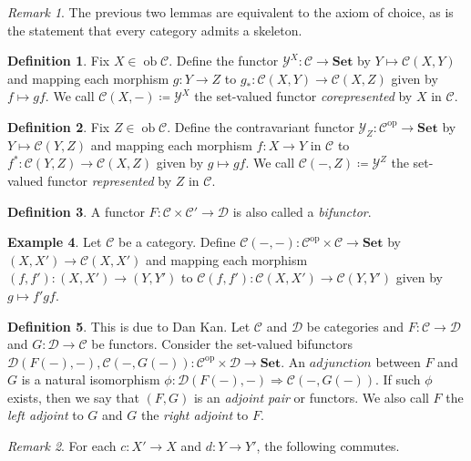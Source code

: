 \documentclass[10pt,letterpaper,cm]{nupset}
\theoremstyle{definition}
\newtheorem{definition}{Definition}
\newtheorem{exmp}[definition]{Example}
\theoremstyle{theorem}
\theoremstyle{remark}
\newtheorem{remark}{Remark}
\newcommand{\1}{\mathbf{1}}
\renewcommand{\c}{\mathscr{C}}
\renewcommand{\d}{\mathscr{D}}
\newcommand{\y}{\mathscr{Y}}
\newcommand{\0}{\vec 0}
\DeclareMathOperator{\op}{op}
\DeclareMathOperator{\ob}{ob}
\begin{document}
\begin{remark}
The previous two lemmas are equivalent to the axiom of choice, as is the statement that every category admits a skeleton.
\end{remark}

\begin{definition}
Fix $X \in \ob \c$. Define the functor $\y^X : \c \to \mathbf{Set}$ by $Y \mapsto \c(X, Y)$  and mapping each morphism $g: Y \to Z$ to $g_{\ast} : \c(X, Y) \to \c(X, Z)$ given by $f \mapsto gf$. We call $\c(X, -)\coloneqq\y^X$ the set-valued functor \textit{corepresented} by $X$ in $\c$.
\end{definition}

\begin{definition}
Fix $Z \in \ob \c$. Define the contravariant functor $\y_Z: \c^{\op} \to \mathbf{Set}$ by $Y \mapsto \c(Y, Z)$ and mapping each morphism $f: X \to Y$ in $\c$ to $f^{\ast} : \c(Y, Z) \to \c(X, Z)$ given by $g\mapsto gf$. We call $\c(-, Z)\coloneqq \y^Z$ the set-valued functor \textit{represented} by $Z$ in $\c$.
\end{definition}

\begin{definition}
A functor $F: \c \times \c' \to \d$ is also called a \textit{bifunctor}.
\end{definition}

\begin{exmp}
Let $\c$ be a category. Define $\c(-, -): \c^{\op} \times \c \to \mathbf{Set}$ by $(X, X') \to \c(X, X')$ and mapping each morphism $(f, f') : (X, X') \to (Y, Y')$ to $\c(f, f') : \c(X, X') \to \c(Y, Y')$ given by $g \mapsto f'gf$.
\end{exmp}

\begin{definition}
This is due to Dan Kan. Let $\c$ and $\d$ be categories and $F : \c \to \d$ and $G: \d \to \c$ be functors. Consider the set-valued bifunctors $ \d(F(-), -), \c(-, G(-)): \c^{\op} \times \d \to \mathbf{Set}$. An $\textit{adjunction}$ between $F$ and $G$ is a natural isomorphism $\phi : \d(F(-), -) \Rightarrow \c(-, G(-))$. If such $\phi$ exists, then we say that $(F, G)$ is an \textit{adjoint pair} or functors. We also call $F$ the \textit{left adjoint} to $G$ and $G$ the \textit{right adjoint} to $F$. 

\begin{remark}
For each $c: X' \to X$ and $d: Y \to Y'$, the following commutes.

\begin{center}
\end{center}

\end{remark}

\end{definition}
\end{document}
